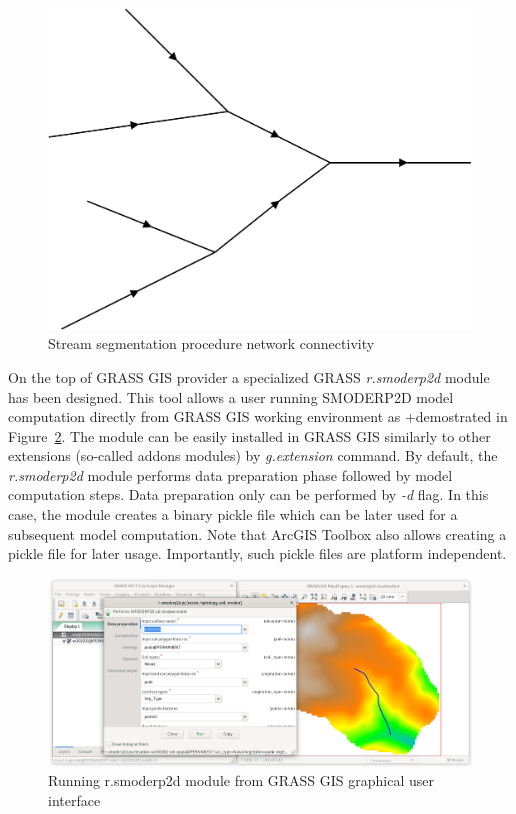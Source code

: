 \begin{figure}[ht!]
  \begin{center}
    \includegraphics[width=0.6\columnwidth]{figures/stream_next_edge}
    \caption{Stream segmentation procedure network connectivity}
    \label{fig:stream_next_edge}
  \end{center}
\end{figure}

On the top of GRASS GIS provider a specialized GRASS {\em r.smoderp2d}
module has been designed. This tool allows a user running SMODERP2D
model computation directly from GRASS GIS working environment as
+demostrated in Figure~\ref{fig:r.smoderp2d}. The module can be easily
installed in GRASS GIS similarly to other extensions (so-called addons
modules) by {\em g.extension} command. By default, the {\em
  r.smoderp2d} module performs data preparation phase followed by
model computation steps. Data preparation only can be performed by
{\em -d} flag. In this case, the module creates a binary pickle file
which can be later used for a subsequent model computation. Note that
ArcGIS Toolbox also allows creating a pickle file for later
usage. Importantly, such pickle files are platform independent.

\begin{figure}[ht!]
  \begin{center}
    \includegraphics[width=1.0\columnwidth]{figures/smoderp2d_grass.png}
    \caption{Running r.smoderp2d module from GRASS GIS graphical user interface}
    \label{fig:r.smoderp2d}
  \end{center}
\end{figure}

